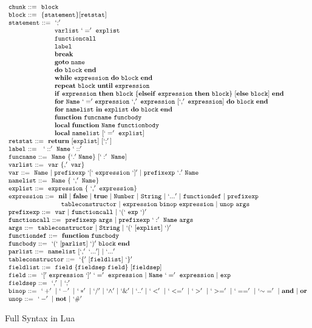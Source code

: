\documentclass{article}
\begin{document}
\newcommand{\syntax}[2]{{\tt #1}{\tt ~::=}{\tt ~~#2}\\}

\newcommand{\syntaxcase}[1]{{\tt \quad\quad\quad\quad\quad\quad~}{\tt ~~#1}\\}

\begin{figure}
\caption{Full Syntax in Lua}
\label{fig:LuaSynFull}
\[
\begin{array}{llr}
  \syntax{chunk}{block}
  \syntax{block}{\{statement\}[retstat]}
  \syntax{statement}{`;'}
  \syntaxcase{varlist~`='~explist}
  \syntaxcase{functioncall}
  \syntaxcase{label}
  \syntaxcase{\bf break}
  \syntaxcase{{\bf goto}~name}
  \syntaxcase{{\bf do}~block~{\bf end}}
  \syntaxcase{{\bf while}~expression~{\bf do}~block~{\bf end}}
  \syntaxcase{{\bf repeat}~block~{\bf until}~expression}
  \syntaxcase{{\bf if}~expression~{\bf then}~block~\{{\bf elseif} ~ expression~{\bf then}~block\} ~[{\bf else}~ block] ~ {\bf end}}
  \syntaxcase{{\bf for}~Name~{\bf `='}~expression~`,'~expression~[`,'~expression]~{\bf do}~block~{\bf end}}
  \syntaxcase{{\bf for}~namelist~{\bf in}~explist~{\bf do}~block~{\bf end}}
  \syntaxcase{{\bf function}~funcname~funcbody}
  \syntaxcase{{\bf local}~{\bf function}~Name~functionbody}
  \syntaxcase{{\bf local}~namelist~[`='~explist]}
  \syntax{retstat}{{\bf return}~[explist]~[`;']}
  \syntax{label}{~`::'~Name~`::'}
  \syntax{funcname}{Name~\{`.'~Name\}~[`:'~Name]}
  \syntax{varlist}{var~\{,'~var\}}
  \syntax{var}{Name ~|~prefixexp~`[`~expression~`]'~|~prefixexp~`.'~Name}
  \syntax{namelist}{Name~\{~`,'~Name\}}
  \syntax{explist}{expression~\{~`,'~expression\}}
  \syntax{expression}{{\bf nil} ~|~{\bf false}~|~{\bf true}~|~Number~|~String~|~`...'~|~functiondef~|~prefixexp}
  \syntaxcase{~~~tableconstructor~|~expression~binop~expression~|~unop~args}
  \syntax{prefixexp}{var ~|~functioncall~|~`(`~exp~`)'}
  \syntax{functioncall}{prefixexp~args ~|~prefixexp~`:'~Name~args}
  \syntax{args}{tableconstructor ~|~String~|~`(`~[explist]~`)'}
  \syntax{functiondef}{{\bf function}~funcbody}
  \syntax{funcbody}{`(`~[parlist]~ `)'~block~{\bf end}}
  \syntax{parlist}{namelist~[`,'~`...']~|~`...'}
  \syntax{tableconstructor}{`\{' ~[fieldlist]~`\}'}
  \syntax{fieldlist}{field ~\{fieldsep~field\}~[fieldsep]}
  \syntax{field}{`[' ~expression~ `]'~`='~expression~|~Name~`='~expression~|~exp}
  \syntax{fieldsep}{`,' ~|~`;'}
  \syntax{binop}{`+'~|~`-'~|~`*'~|~`/'~|~`{\wedge}'~|~`\&'~|~`..'~|~`<'~|~`<='~|~`>'~|~`>='~|~`=='~|~`{\sim}='~|~{\bf and}~|~{\bf or}}
  \syntax{unop}{`-'~|~{\bf not}~|~`\#'}
\end{array}
\]
\end{figure}
\end{document}
